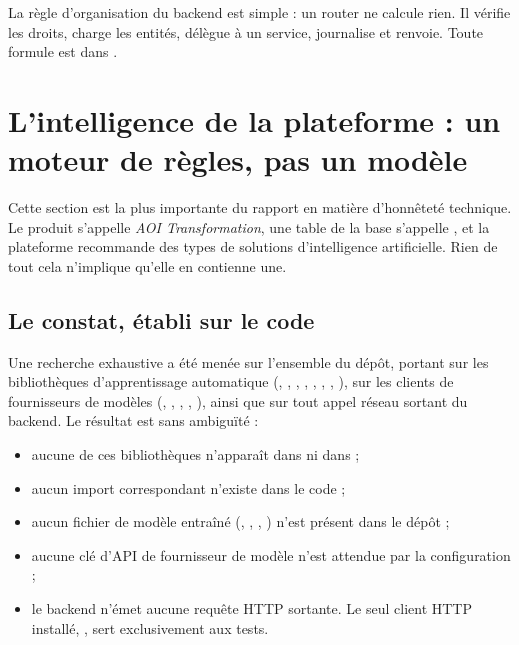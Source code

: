 La règle d'organisation du backend est simple : un router ne calcule rien. Il vérifie
les droits, charge les entités, délègue à un service, journalise et renvoie. Toute
formule est dans .

\section{L'intelligence de la plateforme : un moteur de règles, pas un modèle}
\label{sec:pas-dia}

Cette section est la plus importante du rapport en matière d'honnêteté technique. Le
produit s'appelle \emph{AOI Transformation}, une table de la base s'appelle
, et la plateforme recommande des types de solutions
d'intelligence artificielle. Rien de tout cela n'implique qu'elle en contienne une.

\subsection{Le constat, établi sur le code}

Une recherche exhaustive a été menée sur l'ensemble du dépôt, portant sur les
bibliothèques d'apprentissage automatique (, ,
, , , , ,
), sur les clients de fournisseurs de modèles (,
, , , ), ainsi que sur
tout appel réseau sortant du backend. Le résultat est sans ambiguïté :

\begin{itemize}
  \item aucune de ces bibliothèques n'apparaît dans  ni dans
     ;
  \item aucun import correspondant n'existe dans le code ;
  \item aucun fichier de modèle entraîné (, , ,
    ) n'est présent dans le dépôt ;
  \item aucune clé d'API de fournisseur de modèle n'est attendue par la configuration ;
  \item le backend n'émet aucune requête HTTP sortante. Le seul client HTTP installé,
    , sert exclusivement aux tests.
\end{itemize}

